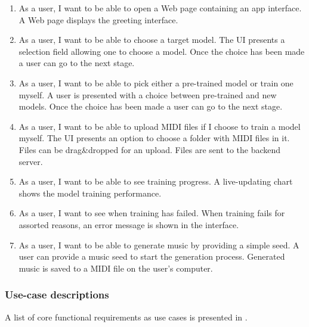 \documentclass[a4paper, 11pt, twoside]{report}
\theoremstyle{definition}
\begin{document}
\begin{enumerate}
    \item
          As a user, I want to be able to open a Web page containing an app interface.
          \AC A Web page displays the greeting interface.

    \item
          As a user, I want to be able to choose a target model.
          \AC The UI presents a selection field allowing one to choose a model.
          \AC Once the choice has been made a user can go to the next stage.

    \item
          As a user, I want to be able to pick either a pre-trained model or train one myself.
          \AC A user is presented with a choice between pre-trained and new models.
          \AC Once the choice has been made a user can go to the next stage.

    \item
          As a user, I want to be able to upload MIDI files if I choose to train a model myself.
          \AC The UI presents an option to choose a folder with MIDI files in it.
          \AC Files can be drag\&dropped for an upload.
          \AC Files are sent to the backend server.

    \item
          As a user, I want to be able to see training progress.
          \AC A live-updating chart shows the model training performance.

    \item
          As a user, I want to see when training has failed.
          \AC When training fails for assorted reasons, an error message is shown in the interface.

    \item
          As a user, I want to be able to generate music by providing a simple seed.
          \AC A user can provide a music seed to start the generation process.
          \AC Generated music is saved to a MIDI file on the user's computer.
\end{enumerate} \par

\subsubsection{Use-case descriptions}

A list of core functional requirements as use cases is presented in . \par
\end{document}
